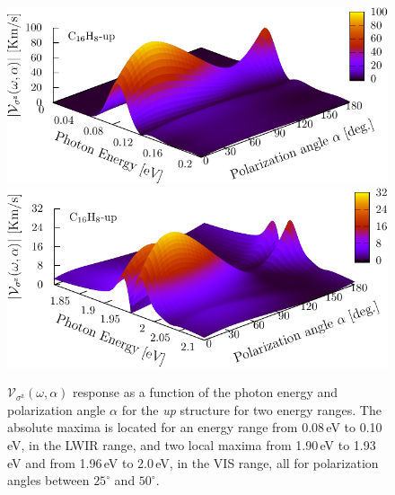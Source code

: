 \documentclass[prb,11pt,tightenlines,twocolumn,aps]{revtex4-1}
\begin{document}
\begin{figure}[t]
    \centering
    \includegraphics[width=\linewidth]{upplots/up-vsz-3d-1}
    \\
    \includegraphics[width=\linewidth]{upplots/up-3d-svaz-2}

    \caption{$\mathcal{V}_{\sigma^{\mathrm{z}}}(\omega,\alpha)$ response
    as a function of the photon energy and polarization angle $\alpha$ for the
    \emph{up} structure for two energy ranges. The absolute maxima is located
    for an energy range from 0.08\,eV to 0.10\,eV, in the LWIR
   range, and two local maxima from 1.90\,eV to 1.93\,eV and from
    1.96\,eV to 2.0\,eV, in the VIS range, all for polarization
    angles between $25^{\circ}$ and $50^{\circ}$.}
    \label{fig:up-vsz-3d}   
\end{figure}
\end{document}
